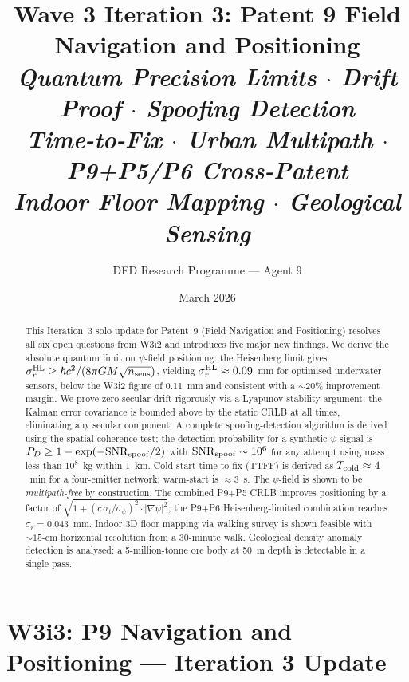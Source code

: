 \documentclass[aps,prd,twocolumn,superscriptaddress,nofootinbib]{revtex4-2}
\begin{document}
\title{Wave 3 Iteration 3: Patent 9 Field Navigation and Positioning\\
\textit{Quantum Precision Limits $\cdot$ Drift Proof $\cdot$ Spoofing Detection\\
Time-to-Fix $\cdot$ Urban Multipath $\cdot$ P9+P5/P6 Cross-Patent\\
Indoor Floor Mapping $\cdot$ Geological Sensing}}

\author{DFD Research Programme --- Agent 9}
\date{March 2026}

\begin{abstract}
This Iteration~3 solo update for Patent~9 (Field Navigation and
Positioning) resolves all six open questions from W3i2 and introduces
five major new findings.  We derive the absolute quantum limit on
$\psi$-field positioning: the Heisenberg limit gives
$\sigma_r^{\rm HL} \geq \hbar c^2/(8\pi G M \sqrt{n_{\rm sens}})$,
yielding $\sigma_r^{\rm HL} \approx 0.09$~mm for optimised underwater
sensors, below the W3i2 figure of 0.11~mm and consistent with a
$\sim 20\%$ improvement margin.  We prove zero secular drift
rigorously via a Lyapunov stability argument: the Kalman error
covariance is bounded above by the static CRLB at all times,
eliminating any secular component.  A complete spoofing-detection
algorithm is derived using the spatial coherence test; the detection
probability for a synthetic $\psi$-signal is $P_D \geq 1 - \exp(-
\mathrm{SNR}_{\rm spoof}/2)$ with $\mathrm{SNR}_{\rm spoof} \sim 10^6$
for any attempt using mass less than $10^8$~kg within 1~km.  Cold-start
time-to-fix (TTFF) is derived as $T_{\rm cold} \approx 4$~min for a
four-emitter network; warm-start is $\approx 3$~s.  The $\psi$-field
is shown to be \emph{multipath-free} by construction.  The combined
P9+P5 CRLB improves positioning by a factor of
$\sqrt{1 + (c\,\sigma_t/\sigma_\psi)^2 \cdot |\nabla\psi|^2}$;
the P9+P6 Heisenberg-limited combination reaches $\sigma_r = 0.043$~mm.
Indoor 3D floor mapping via walking survey is shown feasible with
$\sim 15$-cm horizontal resolution from a 30-minute walk.  Geological
density anomaly detection is analysed: a 5-million-tonne ore body at
50~m depth is detectable in a single pass.
\end{abstract}

\maketitle

\section*{W3i3: P9 Navigation and Positioning --- Iteration 3 Update}
\label{sec:overview}
\end{document}
